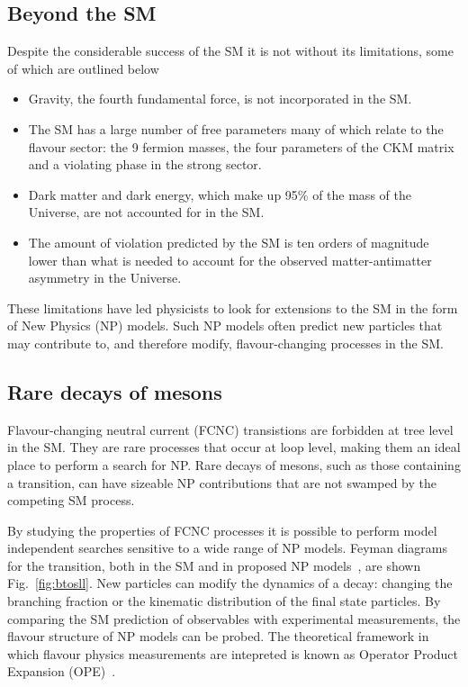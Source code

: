 \subsection{Beyond the SM}

Despite the considerable success of the SM it is not without its limitations, some of which are outlined below

\begin{itemize}
  \item Gravity, the fourth fundamental force, is not incorporated in the SM.
  \item The SM has a large number of free parameters many of which relate to the flavour sector: the 9 fermion masses, the four parameters of the CKM matrix and a \CP violating phase in the strong sector.
  \item Dark matter and dark energy, which make up 95\% of the mass of the Universe, are not accounted for in the SM.
  \item The amount of \CP violation predicted by the SM is ten orders of magnitude lower than what is needed to account for the observed matter-antimatter asymmetry in the Universe.
\end{itemize}

\noindent These limitations have led physicists to look for extensions to the SM in the form of New Physics (NP) models. Such NP models often predict new particles that may contribute to, and therefore modify, flavour-changing processes in the SM.

\subsection{Rare decays of \B mesons}

Flavour-changing neutral current (FCNC) transistions are forbidden at tree level in the SM. They are rare processes that occur at loop level, making them an ideal place to perform a search for NP. Rare decays of \B mesons, such as those containing a \btosll transition, can have sizeable NP contributions that are not swamped by the competing SM process. 

By studying the properties of FCNC processes it is possible to perform model independent searches sensitive to a wide range of NP models. Feyman diagrams for the \btosll transition, both in the SM and in proposed NP models~\cite{bstoll-higgs,bstoll-zprime}, are shown Fig.~\ref{fig:btosll}. New particles can modify the dynamics of a decay: changing the branching fraction or the kinematic distribution of the final state particles. By comparing the SM prediction of observables with experimental measurements, the flavour structure of NP models can be probed. The theoretical framework in which flavour physics measurements are intepreted is known as Operator Product Expansion (OPE)~\cite{ope}.

